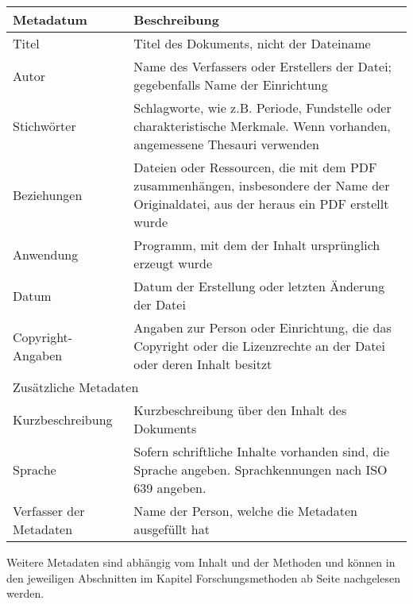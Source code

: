 \begin{center}
	\begin{tabular}{l p{}}
		\toprule
		Metadatum & Beschreibung \\ \midrule
Titel & Titel des Dokuments, nicht der Dateiname\\
Autor & Name des Verfassers oder Erstellers der Datei; gegebenfalls Name der Einrichtung\\
Stichwörter & Schlagworte, wie z.B. Periode, Fundstelle oder charakteristische Merkmale. Wenn vorhanden, angemessene Thesauri verwenden\\
Beziehungen & Dateien oder Ressourcen, die mit dem PDF zusammenhängen, insbesondere der Name der Originaldatei, aus der heraus ein PDF erstellt wurde\\
Anwendung & Programm, mit dem der Inhalt ursprünglich erzeugt wurde\\
Datum & Datum der Erstellung oder letzten Änderung der Datei\\
Copyright-Angaben & Angaben zur Person oder Einrichtung, die das Copyright oder die Lizenzrechte an der Datei oder deren Inhalt besitzt\\
\multicolumn{2}{l}{Zusätzliche Metadaten}\\
Kurzbeschreibung & Kurzbeschreibung über den Inhalt des Dokuments\\
Sprache & Sofern schriftliche Inhalte vorhanden sind, die Sprache angeben. Sprachkennungen nach ISO 639 angeben.\\
Verfasser der Metadaten & Name der Person, welche die Metadaten ausgefüllt hat\\
 		\bottomrule
		\bottomrule
	\end{tabular}
\end{center}

Weitere Metadaten sind abhängig vom Inhalt und der Methoden und können in den jeweiligen Abschnitten im Kapitel Forschungsmethoden ab Seite \pageref{methoden} nachgelesen werden.